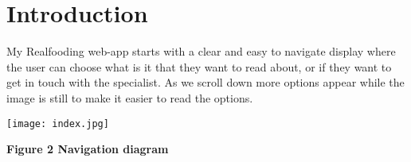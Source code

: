 \documentclass[10pt, a4paper]{article}
\title{\mytitle}
\author{\myauthor\hspace{1em}\\\contact\\Edinburgh Napier University\hspace{0.5em}-\hspace{0.5em}\mymodule}
\date{}
\begin{document}
	\maketitle
	\begin{abstract}
	    The aim of this coursework is to demonstrate my understanding of the Python Flask micro-framework by creating a prototype web application for an online directory about a given subject. The subject here is food, hence why the webpage's title is 'Realfooding' and encourages people to start eating healthier. Food can be divided in real food or ultra-processed food. My web page explains the difference between them and contains many recipes and meal plans depending on the user's lifestyle, where everything is linked to make sure that every ingredient is explained and shows its benefits and drawbacks. Users can also leave doubts or comments that the web owner can then read in the Contact area and answer them.
	\end{abstract}


	\section{Introduction}
	My Realfooding web-app starts with a clear and easy to navigate display where the user can choose what is it that they want to read about, or if they want to get in touch with the specialist. As we scroll down more options appear while the image is still to make it easier to read the options.

	\texttt{[image: index.jpg]}

    \textbf{Figure 2 Navigation diagram}
    \vspace{2mm}
\end{document}

